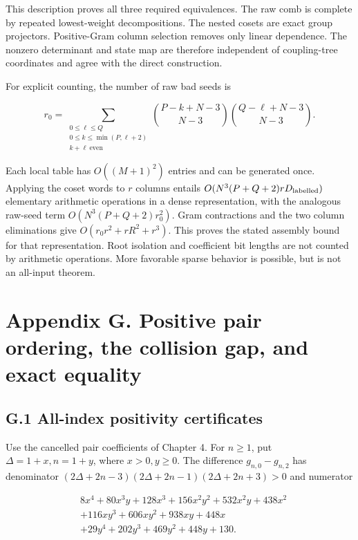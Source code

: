 This description proves all three required equivalences. The raw comb is complete by repeated lowest-weight decompositions. The nested cosets are exact group projectors. Positive-Gram column selection removes only linear dependence. The nonzero determinant and state map are therefore independent of coupling-tree coordinates and agree with the direct construction.

For explicit counting, the number of raw bad seeds is

\[
r_0=\sum_{\substack{0\le\ell\le Q\\0\le k\le\min(P,\ell+2)\\k+\ell\ \mathrm{even}}}
\binom{P-k+N-3}{N-3}\binom{Q-\ell+N-3}{N-3}.
\tag{F.14}
\]

Each local table has \(O((M+1)^2)\) entries and can be generated once. Applying the coset words to \(r\) columns entails \(O(N^3(P+Q+2)rD_{\rm labelled})\) elementary arithmetic operations in a dense representation, with the analogous raw-seed term \(O(N^3(P+Q+2)r_0^2)\). Gram contractions and the two column eliminations give \(O(r_0r^2+rR^2+r^3)\). This proves the stated assembly bound for that representation. Root isolation and coefficient bit lengths are not counted by arithmetic operations. More favorable sparse behavior is possible, but is not an all-input theorem.

\clearpage
\hypertarget{appendix-g.-positive-pair-ordering-the-collision-gap-and-exact-equality}{%
\section{Appendix G. Positive pair ordering, the collision gap, and exact equality}\label{appendix-g.-positive-pair-ordering-the-collision-gap-and-exact-equality}}

\hypertarget{g.1-all-index-positivity-certificates}{%
\subsection{G.1 All-index positivity certificates}\label{g.1-all-index-positivity-certificates}}

Use the cancelled pair coefficients of Chapter 4. For \(n\ge1\), put \(\Delta=1+x,n=1+y\), where \(x>0,y\ge0\). The difference \(g_{n,0}-g_{n,2}\) has denominator \((2\Delta+2n-3)(2\Delta+2n-1)(2\Delta+2n+3)>0\) and numerator

\[
\begin{aligned}
&8x^4+80x^3y+128x^3+156x^2y^2+532x^2y+438x^2\\
&+116xy^3+606xy^2+938xy+448x\\
&+29y^4+202y^3+469y^2+448y+130.
\end{aligned}
\tag{G.1}
\]

